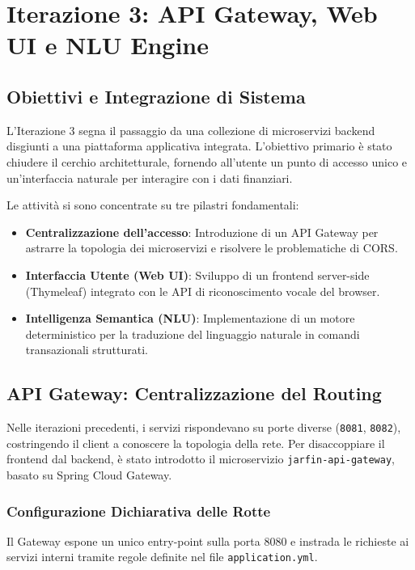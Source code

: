 \chapter{Iterazione 3: API Gateway, Web UI e NLU Engine}
\label{chap:iterazione3}

\section{Obiettivi e Integrazione di Sistema}

L'Iterazione 3 segna il passaggio da una collezione di microservizi backend disgiunti a una piattaforma applicativa integrata. L'obiettivo primario è stato chiudere il cerchio architetturale, fornendo all'utente un punto di accesso unico e un'interfaccia naturale per interagire con i dati finanziari.

Le attività si sono concentrate su tre pilastri fondamentali:
\begin{itemize}
    \item \textbf{Centralizzazione dell'accesso}: Introduzione di un API Gateway per astrarre la topologia dei microservizi e risolvere le problematiche di CORS.
    \item \textbf{Interfaccia Utente (Web UI)}: Sviluppo di un frontend server-side (Thymeleaf) integrato con le API di riconoscimento vocale del browser.
    \item \textbf{Intelligenza Semantica (NLU)}: Implementazione di un motore deterministico per la traduzione del linguaggio naturale in comandi transazionali strutturati.
\end{itemize}

\section{API Gateway: Centralizzazione del Routing}

Nelle iterazioni precedenti, i servizi rispondevano su porte diverse (\texttt{8081}, \texttt{8082}), costringendo il client a conoscere la topologia della rete. Per disaccoppiare il frontend dal backend, è stato introdotto il microservizio \texttt{jarfin-api-gateway}, basato su Spring Cloud Gateway.

\subsection{Configurazione Dichiarativa delle Rotte}
Il Gateway espone un unico entry-point sulla porta 8080 e instrada le richieste ai servizi interni tramite regole definite nel file \texttt{application.yml}.

